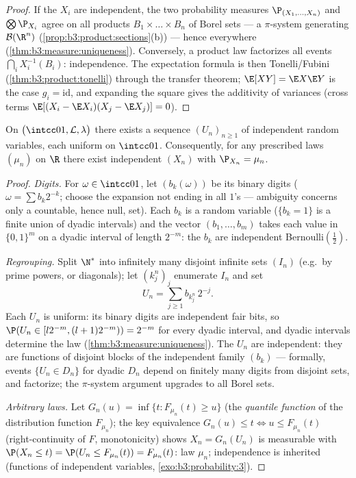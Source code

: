 \begin{proof}
If the $X_i$ are independent, the two probability measures
$\P_{(X_1,\dots,X_n)}$ and $\bigotimes\P_{X_i}$ agree on all
products $B_1\times\dots\times B_n$ of Borel sets --- a
$\pi$-system generating $\mathcal B(\R^n)$
(\cref{prop:b3:product:sections}(b)) --- hence everywhere
(\cref{thm:b3:measure:uniqueness}). Conversely, a product law
factorizes all events $\bigcap_iX_i^{-1}(B_i)$: independence. The expectation formula is then
Tonelli/Fubini (\cref{thm:b3:product:tonelli}) through the
transfer theorem; $\E[XY] = \E X\E Y$ is the case $g_i =
\mathrm{id}$, and expanding the square gives the additivity
of variances (cross terms $\E[(X_i - \E X_i)(X_j - \E X_j)]
= 0$).
\end{proof}

\begin{theorem}
\label{thm:b3:probability:existence}
On $\bigl(\intcc01, \mathcal L, \lambda\bigr)$ there exists a
sequence $(U_n)_{n\geq1}$ of independent random variables,
each uniform on $\intcc01$. Consequently, for any prescribed
laws $(\mu_n)$ on $\R$ there exist independent $(X_n)$ with
$\P_{X_n} = \mu_n$.
\end{theorem}

\begin{proof}
\emph{Digits.} For $\omega \in \intcc01$, let $(b_k(\omega))$
be its binary digits ($\omega = \sum b_k2^{-k}$; choose the
expansion not ending in all $1$'s --- ambiguity concerns only
a countable, hence null, set). Each $b_k$ is a random
variable ($\{b_k = 1\}$ is a finite union of dyadic
intervals) and the vector $(b_1, \dots, b_m)$ takes each
value in $\{0,1\}^m$ on a dyadic interval of length $2^{-m}$:
the $b_k$ are independent Bernoulli$(\frac12)$.

\emph{Regrouping.} Split $\N^*$ into infinitely many disjoint
infinite sets $(I_n)$ (e.g.\ by prime powers, or diagonals);
let $(k^n_j)_j$ enumerate $I_n$ and set
\[
U_n = \sum_{j\geq1} b_{k^n_j}\,2^{-j} .
\]
Each $U_n$ is uniform: its binary digits are independent fair
bits, so $\P(U_n \in [l2^{-m}, (l+1)2^{-m})) = 2^{-m}$ for
every dyadic interval, and dyadic intervals determine the law
(\cref{thm:b3:measure:uniqueness}). The $U_n$ are independent:
they are functions of disjoint blocks of the independent
family $(b_k)$ --- formally, events $\{U_n \in D_n\}$ for
dyadic $D_n$ depend on finitely many digits from disjoint
sets, and factorize; the $\pi$-system argument upgrades to
all Borel sets.

\emph{Arbitrary laws.} Let $G_n(u) = \inf\{t : F_{\mu_n}(t)
\geq u\}$ (the \emph{quantile function} of the distribution
function $F_{\mu_n}$); the key equivalence $G_n(u) \leq t
\iff u \leq F_{\mu_n}(t)$ (right-continuity of $F$,
monotonicity) shows $X_n = G_n(U_n)$ is measurable with
$\P(X_n \leq t) = \P(U_n \leq F_{\mu_n}(t)) =
F_{\mu_n}(t)$: law $\mu_n$; independence is inherited
(functions of independent variables,
\cref{exo:b3:probability:3}).
\end{proof}

